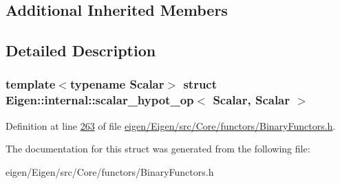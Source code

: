 \subsection*{Additional Inherited Members}


\subsection{Detailed Description}
\subsubsection*{template$<$typename Scalar$>$\newline
struct Eigen\+::internal\+::scalar\+\_\+hypot\+\_\+op$<$ Scalar, Scalar $>$}



Definition at line \hyperlink{eigen_2_eigen_2src_2_core_2functors_2_binary_functors_8h_source_l00263}{263} of file \hyperlink{eigen_2_eigen_2src_2_core_2functors_2_binary_functors_8h_source}{eigen/\+Eigen/src/\+Core/functors/\+Binary\+Functors.\+h}.



The documentation for this struct was generated from the following file\+:\begin{DoxyCompactItemize}
\item 
eigen/\+Eigen/src/\+Core/functors/\+Binary\+Functors.\+h\end{DoxyCompactItemize}
